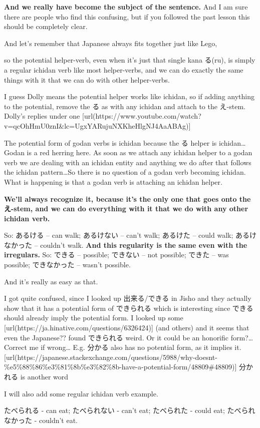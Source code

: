 {}

{\bf And we really have become the subject of the sentence.} And I am sure there are people who find this confusing, but if you followed the past lesson this should be completely clear.

And let's remember that Japanese always fits together just like Lego,

{}

so the potential helper-verb, even when it's just that single kana る(ru), is simply a regular ichidan verb like most helper-verbs, and we can do exactly the same things with it that we can do with other helper-verbs.

I guess Dolly means the potential helper works like ichidan, so if adding anything to the potential, remove the る as with any ichidan and attach to the え-stem. Dolly's replies under one [url(https://www.youtube.com/watch?v=qcOhHmU0znI&lc=UgxYARujuNXKheHlgNJ4AaABAg)]

The potential form of godan verbs is ichidan because the る helper is ichidan\ldots{} Godan is a red herring here. As soon as we attach any ichidan helper to a godan verb we are dealing with an ichidan entity and anything we do after that follows the ichidan pattern\ldots{}So there is no question of a godan verb becoming ichidan. What is happening is that a godan verb is attaching an ichidan helper.

{\bf We'll always recognize it, because it's the only one that goes onto the え-stem, and we can do everything with it that we do with any other ichidan verb.}

{}

So: あるける -- can walk; あるけない -- can't walk; あるけた -- could walk; あるけなかった -- couldn't walk. {\bf And this regularity is the same even with the irregulars.} So: できる -- possible; できない -- not possible; できた -- was possible; できなかった -- wasn't possible.

And it's really as easy as that.

I got quite confused, since I looked up 出来る/できる in Jisho and they actually show that it has a potential form of できられる which is interesting since できる should already imply the potential form. I looked up some [url(https://ja.hinative.com/questions/6326424)] (and others) and it seems that even the Japanese?? found できられる weird. Or it could be an honorific form?\ldots{} Correct me if wrong\ldots{}\crlf
E.g. 分かる also has no potential form, as it implies it. [url(https://japanese.stackexchange.com/questions/5988/why-doesnt-\%e5\%88\%86\%e3\%81\%8b\%e3\%82\%8b-have-a-potential-form/48809\#48809)] 分かれる is another word

\thinrule

I will also add some regular ichidan verb example.

たべられる - can eat; たべられない - can't eat;\crlf
たべられた - could eat; たべられなかった - couldn't eat.

\stopsectionlevel

\stopsectionlevel
